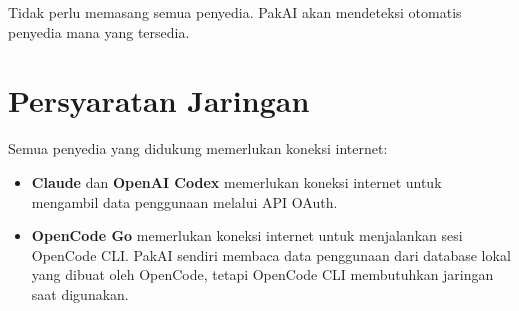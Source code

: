 Tidak perlu memasang semua penyedia. PakAI akan mendeteksi otomatis penyedia
mana yang tersedia.

\section{Persyaratan Jaringan}

Semua penyedia yang didukung memerlukan koneksi internet:

\begin{itemize}
  \item \textbf{Claude} dan \textbf{OpenAI Codex} memerlukan koneksi internet untuk
        mengambil data penggunaan melalui API OAuth.
  \item \textbf{OpenCode Go} memerlukan koneksi internet untuk menjalankan sesi
        OpenCode CLI. PakAI sendiri membaca data penggunaan dari database lokal
        yang dibuat oleh OpenCode, tetapi OpenCode CLI membutuhkan jaringan saat
        digunakan.
\end{itemize}
